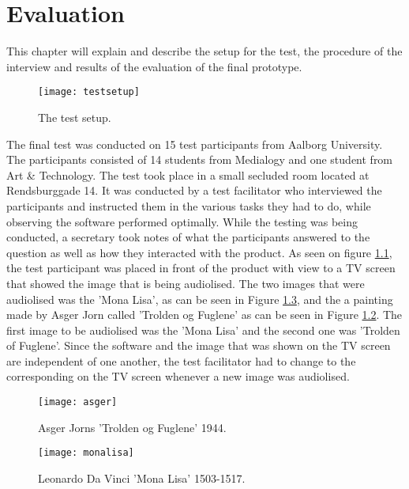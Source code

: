 \chapter{Evaluation}\label{ch:evaluation}
This chapter will explain and describe the setup for the test, the procedure of the interview and results of the evaluation of the final prototype. 

\begin{figure}[!h] 
\centering
\texttt{[image: testsetup]}
\caption{\label{fig:testsetup} The test setup.}
\end{figure}

The final test was conducted on 15 test participants from Aalborg University. The participants consisted of 14 students from Medialogy and one student from Art \& Technology. The test took place in a small secluded room located at Rendsburggade 14. It was conducted by a test facilitator who interviewed the participants and instructed them in the various tasks they had to do, while observing the software performed optimally. While the testing was being conducted, a secretary took notes of what the participants answered to the question as well as how they interacted with the product.
As seen on figure \ref{fig:testsetup}, the test participant was placed in front of the product with view to a TV screen that showed the image that is being audiolised. The two images that were audiolised was the 'Mona Lisa', as can be seen in Figure \ref{fig:monalisa}, and the a painting made by Asger Jorn called 'Trolden og Fuglene' as can be seen in Figure \ref{fig:asger}. The first image to be audiolised was the 'Mona Lisa' and the second one was 'Trolden of Fuglene'. Since the software and the image that was shown on the TV screen are independent of one another, the test facilitator had to change to the corresponding on the TV screen whenever a new image was audiolised.

\begin{figure}[!h] 
\centering
\texttt{[image: asger]}
\caption{\label{fig:asger} Asger Jorns 'Trolden og Fuglene' 1944.}
\end{figure}

\begin{figure}[!h] 
\centering
\texttt{[image: monalisa]}
\caption{\label{fig:monalisa} Leonardo Da Vinci 'Mona Lisa' 1503-1517.}
\end{figure}

